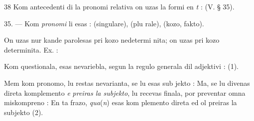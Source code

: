 \begin{VUpage}[42]{38}
Kom antecedenti di la pronomi relativa on uzas la formi\nl
en \textit{t} :  (V. § 35).

\VUsaut{6.85mm}
\VUsaut{6.00mm}

35. --- Kom \textit{pronomi} li esas :  (singulare),  (plu\cc
rale),  (kozo, fakto).

On uzas  nur kande parolesas pri kozo nedetermi\cc
nita; on uzas  pri kozo determinita. Ex. : \nl
{}

Kom  questionala,  esas nevariebla, segun la\nl
regulo generala dil adjektivi : \nl
{} (1).

Mem kom pronomo, lu restas nevarianta, se lu esas sub\cc
jekto :  Ma, se lu divenas direta komplemento \textit{e}\nl
\textit{preiras la subjekto}, lu recevas  finala, por preventar omna\nl
miskompreno :  En ta frazo, \textit{qua}(\textit{n}) esas kom\cc
plemento direta ed ol preiras la subjekto  (2).
\end{VUpage}

